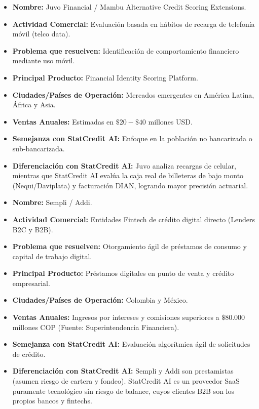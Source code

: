 \documentclass[11pt,a4paper]{article}
\begin{document}
\begin{tcolorbox}[title=4. Competidor: Juvo / Mambu (Alternative Scoring Modules)]
\begin{itemize}[leftmargin=*, noitemsep]
    \item \textbf{Nombre:} Juvo Financial / Mambu Alternative Credit Scoring Extensions.
    \item \textbf{Actividad Comercial:} Evaluación basada en hábitos de recarga de telefonía móvil (telco data).
    \item \textbf{Problema que resuelven:} Identificación de comportamiento financiero mediante uso móvil.
    \item \textbf{Principal Producto:} Financial Identity Scoring Platform.
    \item \textbf{Ciudades/Países de Operación:} Mercados emergentes en América Latina, África y Asia.
    \item \textbf{Ventas Anuales:} Estimadas en $\$20 - \$40$ millones USD.
    \item \textbf{Semejanza con StatCredit AI:} Enfoque en la población no bancarizada o sub-bancarizada.
    \item \textbf{Diferenciación con StatCredit AI:} Juvo analiza recargas de celular, mientras que StatCredit AI evalúa la caja real de billeteras de bajo monto (Nequi/Daviplata) y facturación DIAN, logrando mayor precisión actuarial.
\end{itemize}
\end{tcolorbox}

\begin{tcolorbox}[title=5. Competidor: Sempli / Addi (Fintech Originadoras Directas)]
\begin{itemize}[leftmargin=*, noitemsep]
    \item \textbf{Nombre:} Sempli / Addi.
    \item \textbf{Actividad Comercial:} Entidades Fintech de crédito digital directo (Lenders B2C y B2B).
    \item \textbf{Problema que resuelven:} Otorgamiento ágil de préstamos de consumo y capital de trabajo digital.
    \item \textbf{Principal Producto:} Préstamos digitales en punto de venta y crédito empresarial.
    \item \textbf{Ciudades/Países de Operación:} Colombia y México.
    \item \textbf{Ventas Anuales:} Ingresos por intereses y comisiones superiores a $\$80.000$ millones COP (Fuente: Superintendencia Financiera).
    \item \textbf{Semejanza con StatCredit AI:} Evaluación algorítmica ágil de solicitudes de crédito.
    \item \textbf{Diferenciación con StatCredit AI:} Sempli y Addi son prestamistas (asumen riesgo de cartera y fondeo). StatCredit AI es un proveedor SaaS puramente tecnológico sin riesgo de balance, cuyos clientes B2B son los propios bancos y fintechs.
\end{itemize}
\end{tcolorbox}
\end{document}
